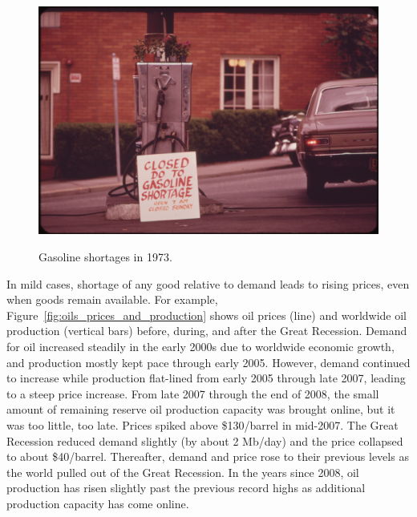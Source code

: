 \begin{figure}[!ht]
\centering\
\includegraphics[width=\linewidth]{Part_0/Chapter_Introduction/images/gas_shortage_1973.jpg}
\caption[Gasoline shortage]{Gasoline shortages in 1973.\cite{Falconer:1973aa}}
\label{fig:gas_shortage}
\end{figure}

In mild cases,
shortage of any good relative to demand leads to rising prices,
even when goods remain available.
For example,
Figure~\ref{fig:oils_prices_and_production} shows oil prices (line) and 
worldwide oil production (vertical bars) 
before, during, and after the Great Recession. 
Demand for oil increased steadily in the early 2000s
due to worldwide economic growth, 
and production mostly kept pace through early 2005.
However, demand continued to increase while 
production flat-lined from early 2005 through late 2007, 
leading to a steep price increase.
From late 2007 through the end of 2008, 
the small amount of remaining reserve oil production capacity was brought online,
but it was too little, too late.
Prices spiked above \$130/barrel in mid-2007. 
The Great Recession reduced demand slightly (by about 2 Mb/day)
and the price collapsed to about \$40/barrel.
Thereafter, demand and price rose to their previous levels 
as the world pulled out of the Great Recession.
In the years since 2008, oil production has risen slightly past the previous record highs
as additional production capacity has come online.

